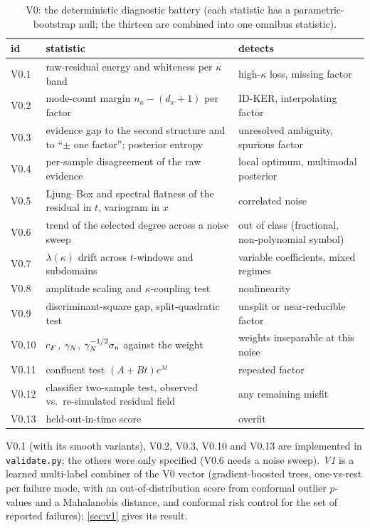 \begin{table}[tbp]
\centering\small
\caption{V0: the deterministic diagnostic battery (each statistic has a parametric-bootstrap null; the thirteen are combined into one omnibus statistic).}\label{tab:v0}
\begin{tabular}{@{}p{0.9cm}p{6.2cm}p{4.6cm}@{}}
\toprule
id & statistic & detects\\
\midrule
V0.1 & raw-residual energy and whiteness per $\kappa$ band & high-$\kappa$ loss, missing factor\\
V0.2 & mode-count margin $n_\kappa-(d_x+1)$ per factor & ID-KER, interpolating factor\\
V0.3 & evidence gap to the second structure and to ``$\pm$ one factor''; posterior entropy & unresolved ambiguity, spurious factor\\
V0.4 & per-sample disagreement of the raw evidence & local optimum, multimodal posterior\\
V0.5 & Ljung--Box and spectral flatness of the residual in $t$, variogram in $x$ & correlated noise\\
V0.6 & trend of the selected degree across a noise sweep & out of class (fractional, non-polynomial symbol)\\
V0.7 & $\lambda(\kappa)$ drift across $t$-windows and subdomains & variable coefficients, mixed regimes\\
V0.8 & amplitude scaling and $\kappa$-coupling test & nonlinearity\\
V0.9 & discriminant-square gap, split-quadratic test & unsplit or near-reducible factor\\
V0.10 & $c_{F}$, $\gamma_{N}$, $\gamma_{N}^{-1/2}\sigma_{n}$ against the weight & weights inseparable at this noise\\
V0.11 & confluent test $(A+Bt)e^{\lambda t}$ & repeated factor\\
V0.12 & classifier two-sample test, observed vs.\ re-simulated residual field & any remaining misfit\\
V0.13 & held-out-in-time score & overfit\\
\bottomrule
\end{tabular}
\end{table}
V0.1 (with its smooth variants), V0.2, V0.3, V0.10 and V0.13 are implemented in \texttt{validate.py}; the others were only specified (V0.6 needs a noise sweep). \emph{V1} is a learned multi-label combiner of the V0 vector (gradient-boosted trees, one-vs-rest per failure mode, with an out-of-distribution score from conformal outlier $p$-values and a Mahalanobis distance, and conformal risk control for the set of reported failures); \cref{sec:v1} gives its result.

